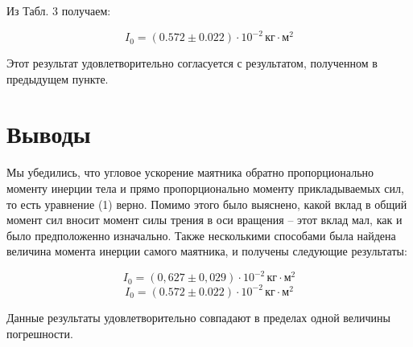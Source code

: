 \documentclass[12pt,a4paper]{scrartcl}
\begin{document}
 	Из Табл. 3 получаем:
 	
 	$$I_0 = (0.572 \pm 0.022) \cdot 10^{-2}\,\text{кг}\cdot\text{м}^2$$
 	
 	Этот результат удовлетворительно согласуется с результатом, полученном в предыдущем пункте.
 	
 	\section{Выводы}
 	
 	Мы убедились, что угловое ускорение маятника обратно пропорционально моменту инерции тела и прямо пропорционально моменту прикладываемых сил, то есть уравнение (1) верно. Помимо этого было выяснено, какой вклад в общий момент сил вносит момент силы трения в оси вращения -- этот вклад мал, как и было предположенно изначально. Также несколькими способами была найдена величина момента инерции самого маятника, и получены следующие результаты:
 	
 	$$I_0 = (0,627 \pm 0,029) \cdot 10^{-2}\,\text{кг}\cdot\text{м}^2$$
 	$$I_0 = (0.572 \pm 0.022) \cdot 10^{-2}\,\text{кг}\cdot\text{м}^2$$
 	
 	Данные результаты удовлетворительно совпадают в пределах одной величины погрешности. 	
\end{document}
